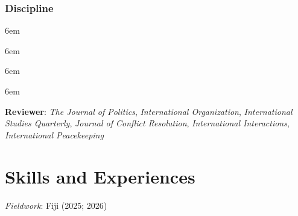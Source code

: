\documentclass{clean_cv}
\begin{document}
\subsubsection*{Discipline}
\begin{datetabular}{6em}
\end{datetabular}

\begin{datetabular}{6em}
\end{datetabular}

\begin{datetabular}{6em}

\end{datetabular}

\begin{datetabular}{6em}

\end{datetabular}

\vspace{1.5em}
\textbf{Reviewer}: \textit{The Journal of Politics}, \textit{International Organization}, \textit{International Studies Quarterly}, \textit{Journal of Conflict Resolution}, \textit{International Interactions}, \textit{International Peacekeeping}

\section{Skills and Experiences}

\textit{Fieldwork}: Fiji (2025; 2026)

\vspace{0.5em}
\end{document}

